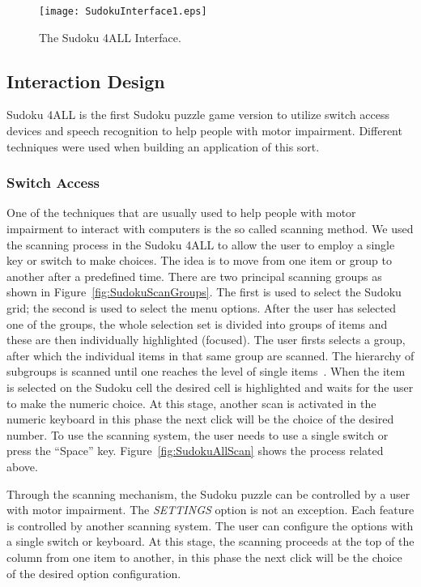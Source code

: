 \documentclass[doublespace,11pt]{article}
\begin{document}
\begin{spacing}{1}
\begin{figure}
\begin{center}
\texttt{[image: SudokuInterface1.eps]}
\end{center}
\caption{The Sudoku 4ALL Interface.}
\label{fig:SudokuInterface}
\end{figure}

\subsection{Interaction Design}

Sudoku 4ALL is the first Sudoku puzzle game version to utilize switch access devices and speech recognition to help 
people with motor impairment.
Different techniques were used when building an application of this sort.

\subsubsection{Switch Access}

One of the techniques that are usually used to help people with motor impairment to interact with 
computers is the so called scanning method. We used the scanning process in the Sudoku 4ALL to 
allow the user to employ a single key or switch to make choices. The idea is to move from one item 
or group to another after a predefined time. 
There are two principal scanning groups as shown in Figure~\ref{fig:SudokuScanGroups}. The first is used to select the Sudoku 
grid; the second is used to select the menu options. After the user has selected one of the groups, 
the whole selection set is divided into groups of items and these are then individually highlighted (focused). 
The user firsts selects a group, after which the individual items in that same group are scanned. The 
hierarchy of subgroups is scanned until one reaches the level of single items~\cite{snorte:07a}. 
When the item is selected on the Sudoku cell the desired cell is highlighted and waits for the user to make 
the numeric choice. At this stage, another scan is activated in the numeric keyboard in this phase the 
next click will be the choice of the desired number. To use the scanning system, the user needs to use a 
single switch or press the ``Space'' key. Figure~\ref{fig:SudokuAllScan} shows the process related above.

Through the scanning mechanism, the Sudoku puzzle can be controlled by a user with motor impairment. 
The \emph{SETTINGS} option is not an exception. Each feature is controlled by another scanning system. 
The user can configure the options with a single switch or keyboard. At this stage, the scanning proceeds 
at the top of the column from one item to another, in this phase the next click will be the choice of the 
desired option configuration. 



\end{spacing}
\end{document}

